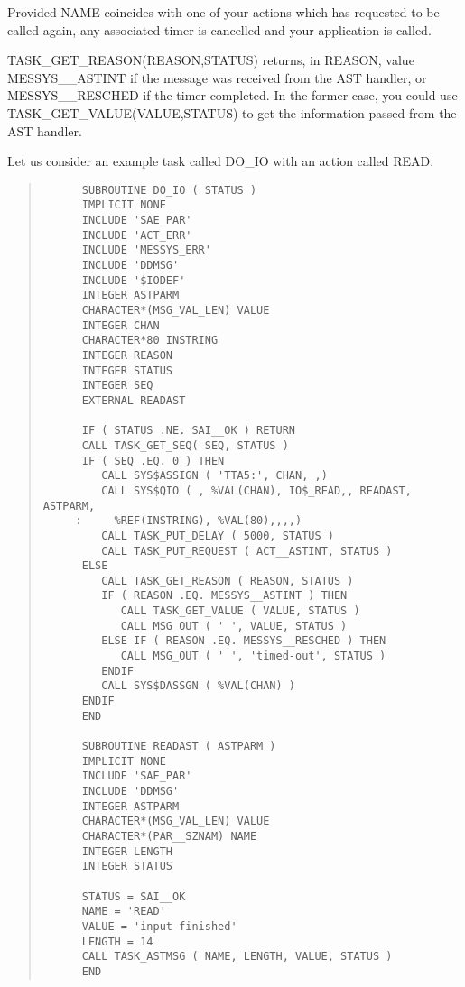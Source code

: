 Provided NAME coincides with one of your actions which has requested to be 
called again, any associated timer is cancelled and your application is called.

TASK\_GET\_REASON(REASON,STATUS) returns, in REASON, value
MESSYS\_\_ASTINT if the message was received from the AST handler,
or MESSYS\_\-\_\-RESCHED if the timer completed.
In the former case, you could use 
TASK\_GET\_VALUE(VALUE,STATUS) to get the information passed from the AST 
handler.

Let us consider an example task called DO\_IO with an action called READ.


\small \begin{quote} \begin{verbatim}
      SUBROUTINE DO_IO ( STATUS )
      IMPLICIT NONE
      INCLUDE 'SAE_PAR'
      INCLUDE 'ACT_ERR'
      INCLUDE 'MESSYS_ERR'
      INCLUDE 'DDMSG'
      INCLUDE '$IODEF'
      INTEGER ASTPARM
      CHARACTER*(MSG_VAL_LEN) VALUE
      INTEGER CHAN
      CHARACTER*80 INSTRING
      INTEGER REASON
      INTEGER STATUS
      INTEGER SEQ
      EXTERNAL READAST

      IF ( STATUS .NE. SAI__OK ) RETURN
      CALL TASK_GET_SEQ( SEQ, STATUS )
      IF ( SEQ .EQ. 0 ) THEN
         CALL SYS$ASSIGN ( 'TTA5:', CHAN, ,)
         CALL SYS$QIO ( , %VAL(CHAN), IO$_READ,, READAST, ASTPARM, 
     :     %REF(INSTRING), %VAL(80),,,,)
         CALL TASK_PUT_DELAY ( 5000, STATUS )
         CALL TASK_PUT_REQUEST ( ACT__ASTINT, STATUS )
      ELSE
         CALL TASK_GET_REASON ( REASON, STATUS )
         IF ( REASON .EQ. MESSYS__ASTINT ) THEN
            CALL TASK_GET_VALUE ( VALUE, STATUS )
            CALL MSG_OUT ( ' ', VALUE, STATUS )
         ELSE IF ( REASON .EQ. MESSYS__RESCHED ) THEN
            CALL MSG_OUT ( ' ', 'timed-out', STATUS )
         ENDIF
         CALL SYS$DASSGN ( %VAL(CHAN) )
      ENDIF
      END

      SUBROUTINE READAST ( ASTPARM )
      IMPLICIT NONE
      INCLUDE 'SAE_PAR'
      INCLUDE 'DDMSG'
      INTEGER ASTPARM
      CHARACTER*(MSG_VAL_LEN) VALUE
      CHARACTER*(PAR__SZNAM) NAME
      INTEGER LENGTH
      INTEGER STATUS

      STATUS = SAI__OK
      NAME = 'READ'
      VALUE = 'input finished'
      LENGTH = 14
      CALL TASK_ASTMSG ( NAME, LENGTH, VALUE, STATUS )
      END
\end{verbatim} \end{quote} \normalsize



